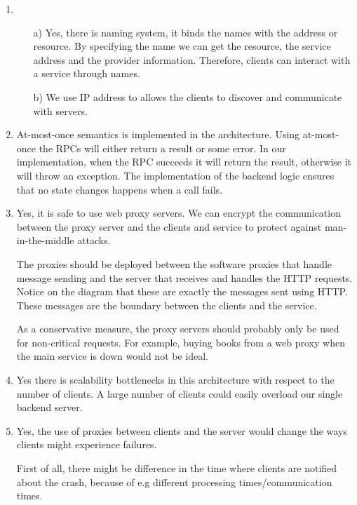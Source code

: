 \documentclass[11pt]{article}
\begin{document}
\begin{enumerate}
\begin{itemize}
    \end{itemize}
  \item
    \begin{itemize}
      \item[a)]
        Yes, there is naming system, it binds the names with the address or
        resource.  By specifying the name  we can get the resource, the service
        address and the provider information. Therefore, clients can interact with a
        service through names.

      \item[b)]
        We use IP address to allows the clients to discover and communicate with
        servers.
    \end{itemize}
  \item
    At-most-once semantics is implemented in the architecture. Using at-most-once
    the RPCs will either return a result or some error. In our
    implementation, when the RPC succeeds it will return the result, otherwise it
    will throw an exception. The implementation of the backend logic ensures
    that no state changes happens when a call fails.
  \item
    Yes, it is safe to use web proxy servers. We can encrypt the
    communication between the proxy server and the clients and service to
    protect against man-in-the-middle attacks. 

    The proxies should be deployed between the software proxies that handle
    message sending and the server that receives and handles the HTTP requests.
    Notice on the diagram that these are exactly the messages sent using HTTP.
    These messages are the boundary between the clients and the service.

    As a conservative measure, the proxy servers should probably only be used
    for non-critical requests. For example, buying books from a web proxy when
    the main service is down would not be ideal.
  \item
    Yes there is scalability bottlenecks in this architecture with respect to the
    number of clients. A large number of clients could easily overload our
    single backend server.
  \item
    Yes, the use of proxies between clients and the server would change the ways
    clients might experience failures.
    
    First of all, there might be difference in the time where clients are
    notified about the crash, because of e.g different processing
    times/communication times.


\end{enumerate}
\end{document}
